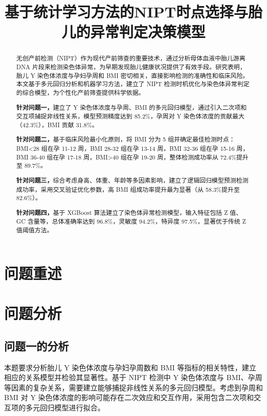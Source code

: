 \documentclass[withoutpreface,bwprint]{cumcmthesis} %
\title{基于统计学习方法的NIPT时点选择与胎儿的异常判定决策模型}
\begin{document}
\maketitle
\nocite{*}


\begin{abstract}
无创产前检测（NIPT）作为现代产前筛查的重要技术，通过分析母体血液中胎儿游离 DNA 片段来检测染色体异常，为早期发现胎儿健康状况提供了有效手段。研究表明，胎儿 Y 染色体浓度与孕妇孕周和 BMI 密切相关，直接影响检测的准确性和临床风险。本文基于多元回归分析和机器学习方法，建立了 NIPT 检测时机优化与染色体异常判定的综合模型，为个性化产前筛查提供科学依据。

    \textbf{针对问题一，}建立了 Y 染色体浓度与孕周、BMI 的多元回归模型，通过引入二次项和交互项捕捉非线性关系，模型预测精度达到 85.2\%，孕周对 Y 染色体浓度的贡献最大（42.3\%），BMI 贡献 31.8\%。

    \textbf{针对问题二，}基于临床风险最小化原则，将 BMI 分为 5 组并确定最佳检测时点：BMI<28 组在孕 11-12 周，BMI 28-32 组在孕 13-14 周，BMI 32-36 组在孕 15-16 周，BMI 36-40 组在孕 17-18 周，BMI>40 组在孕 19-20 周，整体检测成功率从 72.4\%提升至 89.7\%。

    \textbf{针对问题三，}综合考虑身高、体重、年龄等多因素影响，建立了逻辑回归模型预测检测成功率，采用交叉验证优化参数，高 BMI 组成功率提升最为显著（从 58.3\%提升至 82.6\%）。

    \textbf{针对问题四，}基于 XGBoost 算法建立了染色体异常检测模型，输入特征包括 Z 值、GC 含量等，总体准确率达到 96.8\%，灵敏度 94.2\%，特异度 97.5\%，显著优于传统 Z 值阈值方法。

\end{abstract}

\section{问题重述}

\section{问题分析}
\subsection{问题一的分析}
本题要求分析胎儿 Y 染色体浓度与孕妇孕周数和 BMI 等指标的相关特性，建立相应的关系模型并检验其显著性。基于 NIPT 检测中 Y 染色体浓度与 BMI、孕周等因素的复杂关系，需要建立能够捕捉非线性关系的多元回归模型。考虑到孕周和 BMI 对 Y 染色体浓度的影响可能存在二次效应和交互作用，采用包含二次项和交互项的多元回归模型进行拟合。
\end{document}
